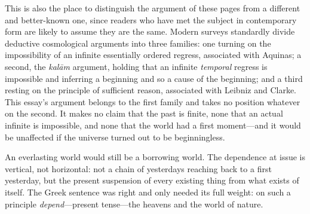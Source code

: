 This is also the place to distinguish the argument of these pages from a different and better-known one, since readers who have met the subject in contemporary form are likely to assume they are the same. Modern surveys standardly divide deductive cosmological arguments into three families: one turning on the impossibility of an infinite essentially ordered regress, associated with Aquinas; a second, the \emph{kal\=am} argument, holding that an infinite \emph{temporal} regress is impossible and inferring a beginning and so a cause of the beginning; and a third resting on the principle of sufficient reason, associated with Leibniz and Clarke. This essay's argument belongs to the first family and takes no position whatever on the second. It makes no claim that the past is finite, none that an actual infinite is impossible, and none that the world had a first moment---and it would be unaffected if the universe turned out to be beginningless.

An everlasting world would still be a borrowing world. The dependence at issue is vertical, not horizontal: not a chain of yesterdays reaching back to a first yesterday, but the present suspension of every existing thing from what exists of itself. The Greek sentence was right and only needed its full weight: on such a principle \emph{depend}---present tense---the heavens and the world of nature.
